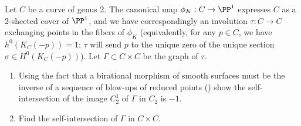 \begin{exercise}\label{blow-up of $J(C)$ at a point}
Let $C$ be a curve of genus 2. The canonical map $\phi_K : C \to \PP^1$ expresses $C$ as a 2-sheeted cover of $\PP^1$, and we have correspondingly an involution $\tau : C \to C$ exchanging points in the fibers of $\phi_K$ (equivalently, for any $p \in C$, we have $h^0(K_C(-p)) = 1$; $\tau$ will send $p$ to the unique zero of the unique section $\sigma \in H^0(K_C(-p))$). Let $\Gamma \subset C \times C$ be the graph of $\tau$.
\begin{enumerate}
\item Using the fact that a birational morphism of smooth surfaces must be the inverse of a sequence of blow-ups of reduced points (\cite[V.??]{H}) show the self-intersection of the image $C^1_2$ of $\Gamma$ in $C_2$ is $-1$.
\item Find the self-intersection of $\Gamma$ in $C \times C$.
\end{enumerate}
\end{exercise}



